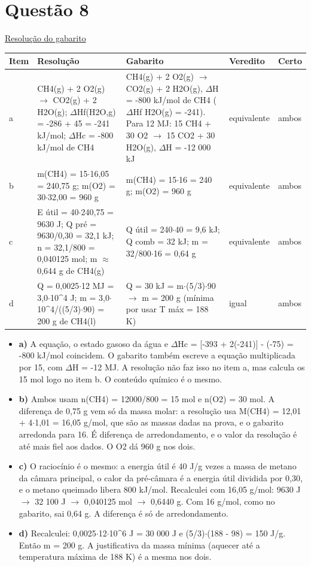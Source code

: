 \documentclass{article}%
\begin{document}
\section*{Questão 8}%
\href{https://poliedroresolve.sistemapoliedro.com.br/vestibulares/ita/2026/ita-2-fase-dia-2-29-10-2025-2-fase-dia-2/dissertativa-8-quimica-2-fase-dia-2-ita-2026}{Resolução do gabarito}\par\smallskip%
\begin{longtable}{@{}p{} p{} p{} p{} p{}@{}}\toprule Item & Resolução & Gabarito & Veredito & Certo \\ \midrule
a & CH4(g) + 2 O2(g) $\to$ CO2(g) + 2 H2O(g); $\Delta$Hf(H2O,g) = -286 + 45 = -241 kJ/mol; $\Delta$Hc = -800 kJ/mol de CH4 & CH4(g) + 2 O2(g) $\to$ CO2(g) + 2 H2O(g), $\Delta$H = -800 kJ/mol de CH4 ($\Delta$Hf H2O(g) = -241). Para 12 MJ: 15 CH4 + 30 O2 $\to$ 15 CO2 + 30 H2O(g), $\Delta$H = -12 000 kJ & equivalente & ambos \\
b & m(CH4) = 15$\cdot$16,05 = 240,75 g; m(O2) = 30$\cdot$32,00 = 960 g & m(CH4) = 15$\cdot$16 = 240 g; m(O2) = 960 g & equivalente & ambos \\
c & E útil = 40$\cdot$240,75 = 9630 J; Q pré = 9630/0,30 = 32,1 kJ; n = 32,1/800 = 0,040125 mol; m $\approx$ 0,644 g de CH4(g) & Q útil = 240$\cdot$40 = 9,6 kJ; Q comb = 32 kJ; m = 32/800$\cdot$16 = 0,64 g & equivalente & ambos \\
d & Q = 0,0025$\cdot$12 MJ = 3,0$\cdot$10\^{}4 J; m = 3,0$\cdot$10\^{}4/((5/3)$\cdot$90) = 200 g de CH4(l) & Q = 30 kJ = m$\cdot$(5/3)$\cdot$90 $\to$ m = 200 g (mínima por usar T máx = 188 K) & igual & ambos \\
\bottomrule\end{longtable}%
\begin{itemize}%
\item%
\textbf{a)} A equação, o estado gasoso da água e $\Delta$Hc = {[}-393 + 2(-241){]} - (-75) = -800 kJ/mol coincidem. O gabarito também escreve a equação multiplicada por 15, com $\Delta$H = -12 MJ. A resolução não faz isso no item a, mas calcula os 15 mol logo no item b. O conteúdo químico é o mesmo.%
\item%
\textbf{b)} Ambos usam n(CH4) = 12000/800 = 15 mol e n(O2) = 30 mol. A diferença de 0,75 g vem só da massa molar: a resolução usa M(CH4) = 12,01 + 4$\cdot$1,01 = 16,05 g/mol, que são as massas dadas na prova, e o gabarito arredonda para 16. É diferença de arredondamento, e o valor da resolução é até mais fiel aos dados. O O2 dá 960 g nos dois.%
\item%
\textbf{c)} O raciocínio é o mesmo: a energia útil é 40 J/g vezes a massa de metano da câmara principal, o calor da pré{-}câmara é a energia útil dividida por 0,30, e o metano queimado libera 800 kJ/mol. Recalculei com 16,05 g/mol: 9630 J $\to$ 32 100 J $\to$ 0,040125 mol $\to$ 0,6440 g. Com 16 g/mol, como no gabarito, sai 0,64 g. A diferença é só de arredondamento.%
\item%
\textbf{d)} Recalculei: 0,0025$\cdot$12$\cdot$10\^{}6 J = 30 000 J e (5/3)$\cdot$(188 - 98) = 150 J/g. Então m = 200 g. A justificativa da massa mínima (aquecer até a temperatura máxima de 188 K) é a mesma nos dois.%
\end{itemize}%
\end{document}
